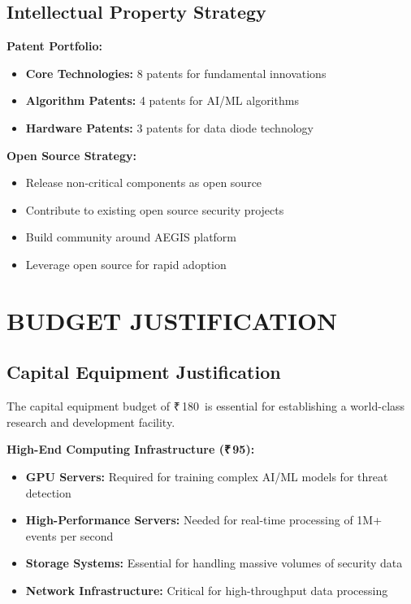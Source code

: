 \documentclass[12pt,a4paper]{article}
\newcommand{\rupees}{₹\,}
\newcommand{\lakhs}{\text{ Lakhs}}
\begin{document}
\subsection{Intellectual Property Strategy}

\textbf{Patent Portfolio:}
\begin{itemize}
    \item \textbf{Core Technologies:} 8 patents for fundamental innovations
    \item \textbf{Algorithm Patents:} 4 patents for AI/ML algorithms
    \item \textbf{Hardware Patents:} 3 patents for data diode technology
\end{itemize}

\textbf{Open Source Strategy:}
\begin{itemize}
    \item Release non-critical components as open source
    \item Contribute to existing open source security projects
    \item Build community around AEGIS platform
    \item Leverage open source for rapid adoption
\end{itemize}

\newpage

\section{BUDGET JUSTIFICATION}

\subsection{Capital Equipment Justification}

The capital equipment budget of \rupees 180\lakhs\ is essential for establishing a world-class research and development facility.

\textbf{High-End Computing Infrastructure (\rupees 95\lakhs):}
\begin{itemize}
    \item \textbf{GPU Servers:} Required for training complex AI/ML models for threat detection
    \item \textbf{High-Performance Servers:} Needed for real-time processing of 1M+ events per second
    \item \textbf{Storage Systems:} Essential for handling massive volumes of security data
    \item \textbf{Network Infrastructure:} Critical for high-throughput data processing
\end{itemize}
\end{document}
